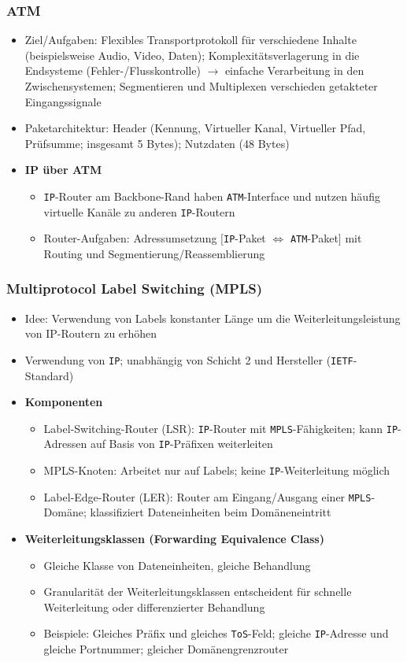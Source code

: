 \subsubsection{ATM}
\begin{itemize}
	\item Ziel/Aufgaben: Flexibles Transportprotokoll für verschiedene Inhalte (beispielsweise Audio, Video, Daten); Komplexitätsverlagerung in die Endsysteme (Fehler-/Flusskontrolle) \(\rightarrow\) einfache Verarbeitung in den Zwischensystemen; Segmentieren und Multiplexen verschieden getakteter Eingangssignale
	\item Paketarchitektur: Header (Kennung, Virtueller Kanal, Virtueller Pfad, Prüfsumme; insgesamt 5 Bytes); Nutzdaten (48 Bytes)
	\item \textbf{IP über ATM}
	\begin{itemize}
		\item \texttt{IP}-Router am Backbone-Rand haben \texttt{ATM}-Interface und nutzen häufig virtuelle Kanäle zu anderen \texttt{IP}-Routern
		\item Router-Aufgaben: Adressumsetzung \(\big\lbrack\)\texttt{IP}-Paket \(\Leftrightarrow\) \texttt{ATM}-Paket\(\big\rbrack\) mit Routing und Segmentierung/Reassemblierung
	\end{itemize}
\end{itemize}

\subsubsection{Multiprotocol Label Switching (MPLS)}
\begin{itemize}
	\item Idee: Verwendung von Labels konstanter Länge um die Weiterleitungsleistung von IP-Routern zu erhöhen
	\item Verwendung von \texttt{IP}; unabhängig von Schicht 2 und Hersteller (\texttt{IETF}-Standard)
	\item \textbf{Komponenten}
	\begin{itemize}
		\item Label-Switching-Router (LSR): \texttt{IP}-Router mit \texttt{MPLS}-Fähigkeiten; kann \texttt{IP}-Adressen auf Basis von \texttt{IP}-Präfixen weiterleiten
		\item MPLS-Knoten: Arbeitet nur auf Labels; keine \texttt{IP}-Weiterleitung möglich
		\item Label-Edge-Router (LER): Router am Eingang/Ausgang einer \texttt{MPLS}-Domäne; klassifiziert Dateneinheiten beim Domäneneintritt
	\end{itemize}
	\item \textbf{Weiterleitungsklassen (Forwarding Equivalence Class)}
	\begin{itemize}
		\item Gleiche Klasse von Dateneinheiten, gleiche Behandlung
		\item Granularität der Weiterleitungsklassen entscheident für schnelle Weiterleitung oder differenzierter Behandlung
		\item Beispiele: Gleiches Präfix und gleiches \texttt{ToS}-Feld; gleiche \texttt{IP}-Adresse und gleiche Portnummer; gleicher Domänengrenzrouter
	\end{itemize}
\end{itemize}

